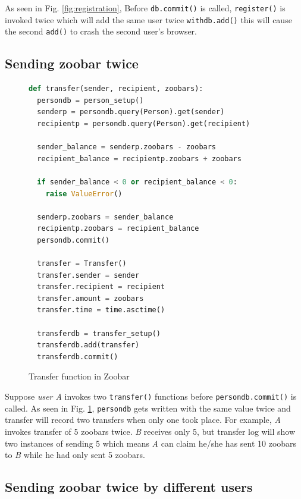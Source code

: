 \documentclass{llncs}
\begin{document}
As seen in Fig. \ref{fig:registration}, Before \texttt{db.commit()} is
called, \texttt{register()} is invoked twice which will add the same
user twice \texttt{withdb.add()} this will cause the second
\texttt{add()} to crash the second user's browser.

\subsection{Sending zoobar twice}

\begin{figure}[h]
  \begin{lstlisting}[language=Python]
def transfer(sender, recipient, zoobars):
  persondb = person_setup()
  senderp = persondb.query(Person).get(sender)
  recipientp = persondb.query(Person).get(recipient)

  sender_balance = senderp.zoobars - zoobars
  recipient_balance = recipientp.zoobars + zoobars

  if sender_balance < 0 or recipient_balance < 0:
    raise ValueError()

  senderp.zoobars = sender_balance
  recipientp.zoobars = recipient_balance
  persondb.commit()

  transfer = Transfer()
  transfer.sender = sender
  transfer.recipient = recipient
  transfer.amount = zoobars
  transfer.time = time.asctime()

  transferdb = transfer_setup()
  transferdb.add(transfer)
  transferdb.commit()
  \end{lstlisting}
  \caption{Transfer function in Zoobar}
  \label{fig:transfer}
\end{figure}

Suppose \textit{user A} invokes two \texttt{transfer()} functions
before \texttt{persondb.commit()} is called. As seen in
Fig. \ref{fig:transfer}, \texttt{persondb} gets written with the same
value twice and transfer will record two transfers when only one took
place. For example, \textit{A} invokes transfer of 5 zoobars
twice. \textit{B} receives only 5, but transfer log will show two
instances of sending 5 which means \textit{A} can claim he/she has
sent 10 zoobars to \textit{B} while he had only sent 5 zoobars.

\subsection{Sending zoobar twice by different users}
\end{document}
